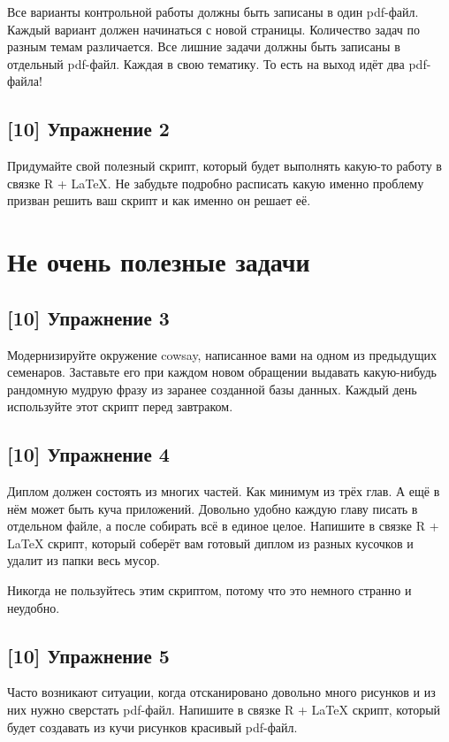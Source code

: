 \documentclass[12pt, a4paper, oneside]{article}
\begin{document}
Все варианты контрольной работы должны быть записаны в один pdf-файл. Каждый вариант должен начинаться с новой страницы. Количество задач по разным темам различается. Все лишние задачи должны быть записаны в отдельный pdf-файл. Каждая в свою тематику. То есть на выход идёт два pdf-файла!


\subsection*{[10]  Упражнение 2}

Придумайте свой полезный скрипт, который будет выполнять какую-то работу в связке R + \LaTeX{}. Не забудьте подробно расписать какую именно проблему призван решить ваш скрипт и как именно он решает её.

\section*{Не очень полезные задачи}

\subsection*{[10]  Упражнение 3}

Модернизируйте окружение cowsay, написанное вами на одном из предыдущих семенаров. Заставьте его при каждом новом обращении выдавать какую-нибудь рандомную мудрую фразу из заранее созданной базы данных. Каждый день используйте этот скрипт перед завтраком.


\subsection*{[10]  Упражнение 4}

Диплом должен состоять из многих частей. Как минимум из трёх глав. А ещё в нём может быть куча приложений. Довольно удобно каждую главу писать в отдельном файле, а после собирать всё в единое целое. Напишите в связке R + \LaTeX{} скрипт, который соберёт вам готовый диплом из разных кусочков и удалит из папки весь мусор.

Никогда не пользуйтесь этим скриптом, потому что это немного странно и неудобно.


\subsection*{[10] Упражнение 5}

Часто возникают ситуации, когда отсканировано довольно много рисунков и из них нужно сверстать pdf-файл. Напишите в связке R + \LaTeX{} скрипт, который будет создавать из кучи рисунков красивый pdf-файл.
\end{document}
